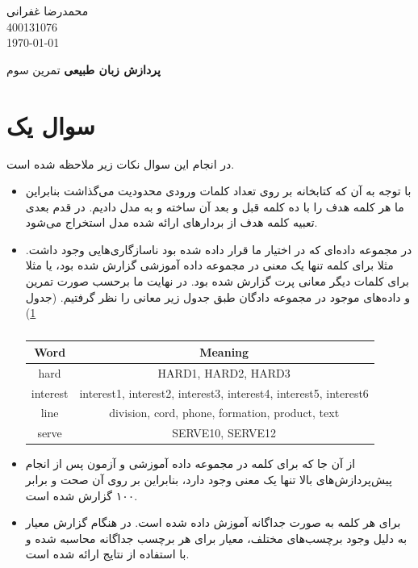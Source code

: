 \documentclass[12pt, a4paper]{article}
\newcommand{\coursetitle}{پردازش زبان طبیعی}
\newcommand{\doctitle}{تمرین سوم}
\newcommand{\name}{محمدرضا غفرانی}
\newcommand{\studentno}{400131076}
\newcommand{\todaydate}{\today}
\begin{document}
\begin{flushleft}
    \name \\
    \studentno \\
    \todaydate
\end{flushleft}

\begin{center}
    \huge
    \textbf{\coursetitle}
    \break
    \large
    \doctitle
\end{center}

\thispagestyle{plain}

\section*{سوال یک}

در انجام این سوال نکات زیر ملاحظه شده است.

\begin{itemize}
    \item با توجه به آن که کتابخانه  بر روی تعداد کلمات ورودی محدودیت می‌گذاشت بنابراین
    ما  هر کلمه هدف را با ده کلمه قبل و بعد آن ساخته و به مدل دادیم. در قدم بعدی تعبیه کلمه
    هدف از بردار‌های ارائه شده مدل استخراج می‌شود.
    \item در مجموعه داده‌ای که در اختیار ما قرار داده شده بود ناسازگاری‌هایی وجود داشت. مثلا برای کلمه 
    تنها یک معنی در مجموعه داده آموزشی گزارش شده بود، یا مثلا برای کلمات دیگر معانی پرت گزارش شده بود.
    در نهایت ما برحسب صورت تمرین و داده‌های موجود در مجموعه دادگان طبق جدول زیر معانی را نظر گرفتیم.
    (جدول \ref{word_meaning})

    \begin{latin}
        \begin{table}[h]
            \caption{}
            \label{word_meaning}
            \begin{tabular}{c|c}
                Word & Meaning \\
                \hline
                hard & HARD1, HARD2, HARD3 \\
                interest & interest1, interest2, interest3, interest4, interest5, interest6 \\
                line & division, cord, phone, formation, product, text \\
                serve & SERVE10, SERVE12
            \end{tabular}
        \end{table}
    \end{latin}

    \item از آن جا که برای کلمه  در مجموعه داده آموزشی و آزمون پس از انجام
    \break پیش‌پردازش‌های بالا تنها یک معنی وجود دارد،
    بنابراین بر روی آن صحت و  برابر ۱۰۰ گزارش شده است.

    \item برای هر کلمه به صورت جداگانه  آموزش داده شده است. در هنگام گزارش معیار 
    به دلیل وجود برچسب‌های مختلف، معیار  برای هر برچسب جداگانه محاسبه شده و با استفاده از 
    نتایج ارائه شده است.
\end{itemize}
\end{document}
